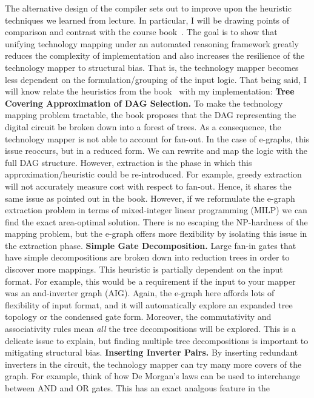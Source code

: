 \documentclass[10pt,letterpaper]{article}
\begin{document}
The alternative design of the compiler sets out to improve upon the heuristic
techniques we learned from lecture. In particular, I will be drawing points of
comparison and contrast with the course book~\cite{coursebook}. The goal is to
show that unifying technology mapping under an automated reasoning framework
greatly reduces the complexity of implementation and also increases the
resilience of the technology mapper to structural bias. That is, the technology
mapper becomes less dependent on the formulation/grouping of the input logic.
That being said, I will know relate the heuristics from the
book~\cite{coursebook} with my implementation: \bigbreak{} \noindent
\textbf{Tree Covering Approximation of DAG Selection.} To make the technology
mapping problem tractable, the book proposes that the DAG representing the
digital circuit be broken down into a forest of trees. As a consequence, the
technology mapper is not able to account for fan-out. In the case of e-graphs,
this issue reoccurs, but in a reduced form. We can rewrite and map the logic
with the full DAG structure. However, extraction is the phase in which this
approximation/heuristic could be re-introduced. For example, greedy extraction
will not accurately measure cost with respect to fan-out. Hence, it shares the
same issue as pointed out in the book. However, if we reformulate the e-graph
extraction problem in terms of mixed-integer linear programming (MILP) we can
find the exact area-optimal solution. There is no escaping the NP-hardness of
the mapping problem, but the e-graph offers more flexibility by isolating this
issue in the extraction phase. \bigbreak{} \noindent \textbf{Simple Gate
    Decomposition.} Large fan-in gates that have simple decompositions are broken
down into reduction trees in order to discover more mappings. This heuristic is
partially dependent on the input format. For example, this would be a
requirement if the input to your mapper was an and-inverter graph (AIG). Again,
the e-graph here affords lots of flexibility of input format, and it will
automatically explore an expanded tree topology or the condensed gate form.
Moreover, the commutativity and associativity rules mean \textit{all} the tree
decompositions will be explored. This is a delicate issue to explain, but
finding multiple tree decompositions is important to mitigating structural
bias. \bigbreak{} \noindent \textbf{Inserting Inverter Pairs.} By inserting
redundant inverters in the circuit, the technology mapper can try many more
covers of the graph. For example, think of how De Morgan's laws can be used to
interchange between AND and OR gates. This has an exact analgous feature in the
\end{document}
